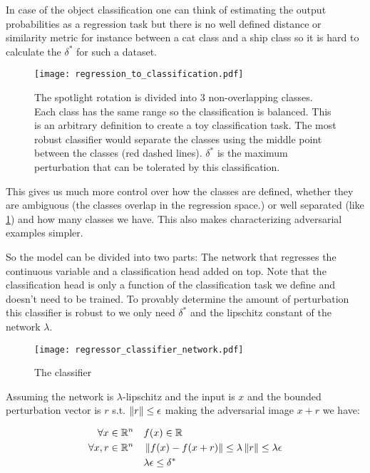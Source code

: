 \documentclass[../thesis.tex]{subfiles}
\begin{document}
In case of the object classification one can think of estimating the output probabilities as a regression task but there is no well defined distance or similarity metric for instance between a cat class and a ship class so it is hard to calculate the $\delta^*$ for such a dataset.  



\begin{figure}[h!]
	\centering
	\texttt{[image: regression\_to\_classification.pdf]}
	\caption{The spotlight rotation is divided into 3 non-overlapping classes. Each class has the same range so the classification is balanced. This is an arbitrary definition to create a toy classification task. The most robust classifier would separate the classes using the middle point between the classes (red dashed lines). $\delta^*$ is the maximum perturbation that can be tolerated by this classification.}
	\label{fig:spotlight_rotation_classes}
\end{figure}

This gives us much more control over how the classes are defined, whether they are ambiguous (the classes overlap in the regression space.) or well separated (like \ref{fig:spotlight_rotation_classes}) and how many classes we have. This also makes characterizing adversarial examples simpler.

So the model can be divided into two parts: The network that regresses the continuous variable and a classification head added on top. Note that the classification head is only a function of the classification task we define and doesn't need to be trained. To provably determine the amount of perturbation this classifier is robust to we only need $\delta^*$ and the lipschitz constant of the network $\lambda$. 

\begin{figure}[h!]
	\centering
	\texttt{[image: regressor\_classifier\_network.pdf]}
	\caption{The classifier}
	\label{fig:regressor_classifier}
\end{figure}

Assuming the network is $\lambda$-lipschitz and the input is $x$ and the bounded perturbation vector is $r$ s.t. $\left\lVert r\right\rVert \leq \epsilon$ making the adversarial image $x+r$ we have: 

\begin{align*}
	\forall x \in \mathbb{R}^n \quad &f(x)\in \mathbb{R} \\
	\forall x,r \in \mathbb{R}^n \quad & \left\lVert f(x) - f(x+r)\right\rVert \leq 
	\lambda \left\lVert r\right\rVert  \leq   \lambda  \epsilon \\
	& \lambda  \epsilon \leq \delta^*
\end{align*}
\end{document}
